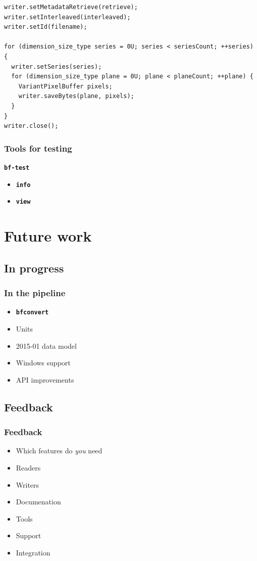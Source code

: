 \documentclass{beamer}
\newcommand{\cmd}[1]{\textbf{\texttt{#1}}}
\begin{document}
\begin{frame}[fragile]
\begin{frame}[fragile]
\begin{lstlisting}
writer.setMetadataRetrieve(retrieve);
writer.setInterleaved(interleaved);
writer.setId(filename);

for (dimension_size_type series = 0U; series < seriesCount; ++series) {
  writer.setSeries(series);
  for (dimension_size_type plane = 0U; plane < planeCount; ++plane) {
    VariantPixelBuffer pixels;
    writer.saveBytes(plane, pixels);
  }
}
writer.close();
  \end{lstlisting}
\end{frame}

\begin{frame}
  \frametitle{Tools for testing}
  \begin{block}{\cmd{bf-test}}
    \begin{itemize}
      \item \cmd{info}
      \item \cmd{view}
    \end{itemize}
  \end{block}
\end{frame}

\section{Future work}
\subsection{In progress}

\begin{frame}
  \frametitle{In the pipeline}
  \begin{itemize}
  \item \cmd{bfconvert}
  \item Units
  \item 2015-01 data model
  \item Windows support
  \item API improvements
  \end{itemize}
\end{frame}

\subsection{Feedback}
\begin{frame}
  \frametitle{Feedback}
  \begin{itemize}
  \item Which features do \emph{you} need
  \item Readers
  \item Writers
  \item Documenation
  \item Tools
  \item Support
  \item Integration
  \end{itemize}


\end{frame}
\end{frame}
\end{document}
